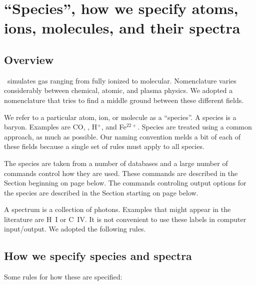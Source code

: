 \section{``Species'', how we specify atoms, ions, molecules, and their spectra}
\label{sec:SpeciesDefine}

\subsection{Overview}
\Cloudy\ simulates gas ranging from fully ionized to molecular.
Nomenclature varies considerably between chemical, atomic, and plasma physics.
We adopted a nomenclature that tries to find a middle ground between
these different fields.

We refer to a particular atom, ion, or molecule as a ``species''.
A species is a baryon.  Examples are CO, \htwo, H$^+$, and Fe$^{22+}$.
Species are treated using a common approach, as much as possible.
Our naming convention melds a bit of each of these fields
because a single set of rules must apply to all species.

The species are taken from a number of databases and a large
number of commands control how they are used.
These commands are described in the Section beginning on page 
\pageref{sec:ControllingAtomicModels} below.
The commands controling output options for the species are
described in the Section starting on page
\pageref{sec:SaveSpecies} below.

A spectrum is a collection of photons.  Examples that might appear in the literature
are H~I or C~IV.  
It is not convenient to use these labels in computer input/output.
We adopted the following rules.

\subsection{How we specify species and spectra}

Some rules for how these are specified:

